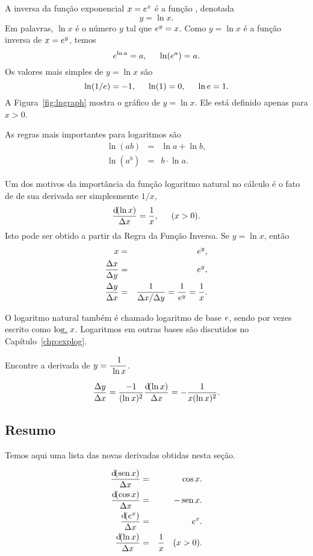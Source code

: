 A inversa da função exponencial $x = e^x$ é a função
, denotada
$$
  y = \ln x.
$$
Em palavras, $\ln x$ é o número $y$ tal que $e^y = x$. Como $y = \ln x$
é a função inversa de $x = e^y$, temos
$$
  e^{\ln a} = a, \hspace{1.5em} \ln(e^a) = a.
$$
Os valores mais simples de $y = \ln x$ são
$$
  \ln(1/e) = -1, \hspace{1.5em} \ln(1) = 0, \hspace{1.5em} \ln e = 1.
$$
A Figura~\ref{fig:lngraph} mostra o gráfico de $y = \ln x$. Ele está
definido apenas para $x > 0$.


As regras mais importantes para logaritmos são
\begin{eqnarray*}
  \ln(ab) & = & \ln a + \ln b, \\
  \ln(a^b) & = & b \cdot \ln a.
\end{eqnarray*}

Um dos motivos da importância da função logaritmo natural no cálculo é
o fato de de sua derivada ser simplesmente $1/x$,
$$
  \frac{\dif(\ln x)}{\dx} = \frac{1}{x}, \hspace{1.5em} (x > 0).
$$
Isto pode ser obtido a partir da Regra da Função Inversa.
Se $y =  \ln x$, então
\begin{eqnarray*}
  x & = & e^y, \\
  \frac{\Delta{x}}{\Delta{y}} & = & e^y, \\
  \frac{\Delta{y}}{\Delta{x}} & = & \frac{1}{\Delta{x}/\Delta{y}} = \frac{1}{e^y} = \frac{1}{x}.
\end{eqnarray*}

O logaritmo natural também é chamado logaritmo de base $e$, sendo por
vezes escrito como $\log_{e} x$. Logaritmos em outras bases são discutidos
no Capítulo~\ref{chp:explog}.

\begin{example} Encontre a derivada de $y = \dsfrac{1}{\ln x}$.
$$
  \frac{\dy}{\dx} = \frac{-1}{(\ln x)^2} \frac{\dif(\ln x)}{\dx} = 
    -\frac{1}{x (\ln x)^2}.
$$
\end{example}

\subsection{Resumo}

Temos aqui uma lista das novas derivadas obtidas nesta seção.

\begin{eqnarray*}
  \frac{\dif(\sen x)}{\dx} & = & \cos x. \\
  \frac{\dif(\cos x)}{\dx} & = & -\sen x. \\
  \frac{\dif(\e^x)}{\dx} & = & \e^x. \\
  \frac{\dif(\ln x)}{\dx} & = & \frac{1}{x} \hspace{1em} (x > 0).
\end{eqnarray*}

